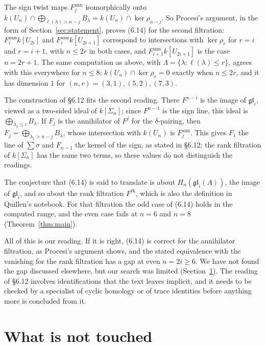 \documentclass[11pt,a4paper]{amsart}
\theoremstyle{definition}
\theoremstyle{remark}
\newcommand{\gl}{\mathfrak{gl}}
\begin{document}
The sign twist maps $F^{\mathrm{ann}}_j$ isomorphically onto $k(U_n) \cap \bigoplus_{\ell(\lambda) > n-j} B_\lambda = k(U_n) \cap \ker \rho_{n-j}$. So Procesi's argument, in the form of Section~\ref{sec:statement}, proves (6.14) for the second filtration: $F^{\mathrm{ann}}_i k[U_{2i}]$ and $F^{\mathrm{ann}}_i k[U_{2i+1}]$ correspond to intersections with $\ker \rho_r$ for $r = i$ and $r = i+1$, with $n \le 2r$ in both cases, and $F^{\mathrm{ann}}_{i+1} k[U_{2i+1}]$ is the case $n = 2r + 1$. The same computation as above, with $\Lambda = \{\lambda : \ell(\lambda) \le r\}$, agrees with this everywhere for $n \le 8$: $k(U_n) \cap \ker \rho_r = 0$ exactly when $n \le 2r$, and it has dimension $1$ for $(n, r) = (3, 1), (5, 2), (7, 3)$.

The construction of \S6.12 fits the second reading. There $F^{n-i}$ is the image of $\gl_i$, viewed as a two-sided ideal of $k[\Sigma_n]$; since $F^{n-1}$ is the sign line, this ideal is $\bigoplus_{\lambda_1 \le i} B_\lambda$. If $F_j$ is the annihilator of $F^j$ for the $\delta$-pairing, then $F_j = \bigoplus_{\lambda_1 > n-j} B_\lambda$, whose intersection with $k(U_n)$ is $F^{\mathrm{ann}}_j$. This gives $F_1$ the line of $\sum \sigma$ and $F_{n-1}$ the kernel of the sign, as stated in \S6.12; the rank filtration of $k[\Sigma_n]$ has the same two terms, so these values do not distinguish the readings.

The conjecture that (6.14) is said to translate is about $H_n(\gl_i(A))$, the image of $\gl_i$, and so about the rank filtration $F^{\mathrm{rk}}$, which is also the definition in Quillen's notebook. For that filtration the odd case of (6.14) holds in the computed range, and the even case fails at $n = 6$ and $n = 8$ (Theorem~\ref{thm:main}).

All of this is our reading. If it is right, (6.14) is correct for the annihilator filtration, as Procesi's argument shows, and the stated equivalence with the vanishing for the rank filtration has a gap at even $n = 2i \ge 6$. We have not found the gap discussed elsewhere, but our search was limited (Section~\ref{sec:open}). The reading of \S6.12 involves identifications that the text leaves implicit, and it needs to be checked by a specialist of cyclic homology or of trace identities before anything more is concluded from it.

\section{What is not touched}\label{sec:open}
\end{document}
